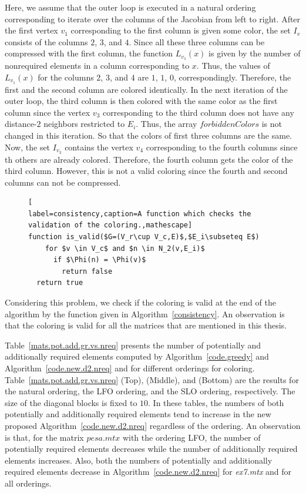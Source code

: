 \documentclass[12pt, twoside,a4paper,toc=bibliography]{scrbook}
\newcommand{\coderef}[1]{Algorithm~\protect\ref{#1}}
\newcommand{\nreq}{L}
\begin{document}
Here, we assume that the outer loop is executed in a natural ordering corresponding to iterate over 
the columns of the Jacobian from left to right.
After the first vertex $v_1$ corresponding to the first column is given some color, 
the set $I_v$ consists of the columns $2$, $3$, and $4$. Since all these three columns
can be compressed with the first column, the function $\nreq_{v_1}(x)$ is given by the number of 
nonrequired elements in a column corresponding to $x$. Thus, the values of $\nreq_{v_1}(x)$ 
for the columns $2$, $3$, and $4$ are $1$, $1$, $0$, correspondingly.
Therefore, the first and the second column are colored identically.
In the next iteration of the outer loop, the third column is then colored with the same color as the first
column since the vertex $v_3$ corresponding to the third column does not have any distance-$2$ neighbors 
restricted to $E_i$. Thus, the array $forbiddenColors$ is not changed in this iteration.
So that the colors of first three columns are the same.
Now, the set $I_{v_3}$ contains the vertex $v_4$ corresponding to the 
fourth columns since th others are already colored. Therefore, the fourth column gets the color of
the third column. However, this is not a valid coloring since the fourth and second columns can not be compressed.
\begin{figure}
\begin{lstlisting}[
label=consistency,caption=A function which checks the validation of the coloring.,mathescape]
function is_valid($G=(V_r\cup V_c,E)$,$E_i\subseteq E$)
    for $v \in V_c$ and $n \in N_2(v,E_i)$
      if $\Phi(n) = \Phi(v)$
        return false
  return true
\end{lstlisting}
\end{figure}
Considering this problem, we check if the coloring is valid at the end of the algorithm
by the function given in \coderef{consistency}.
An observation is that the coloring is valid for all the matrices that are mentioned in this
thesis.

Table~\ref{mats.pot.add.gr.vs.nreq} presents the number of potentially
and additionally required elements computed
by \coderef{code.greedy} and \coderef{code.new.d2.nreq}
and for different orderings for coloring.
Table~\ref{mats.pot.add.gr.vs.nreq} (Top), (Middle), and (Bottom) are
the results for the natural ordering, the LFO ordering, and the SLO ordering, respectively.
The size of the diagonal blocks is fixed to $10$.
In these tables, the numbers of both potentially and additionally required elements
tend to increase in the new proposed \coderef{code.new.d2.nreq} regardless of the ordering.
An observation is that, for the matrix $pesa.mtx$ with the ordering LFO,
the number of potentially required elements decreases
while the number of additionally required elements increases. Also,
both the numbers of potentially and additionally required elements
decrease in \coderef{code.new.d2.nreq} for \textit{ex7.mtx} and for all orderings.
\end{document}

